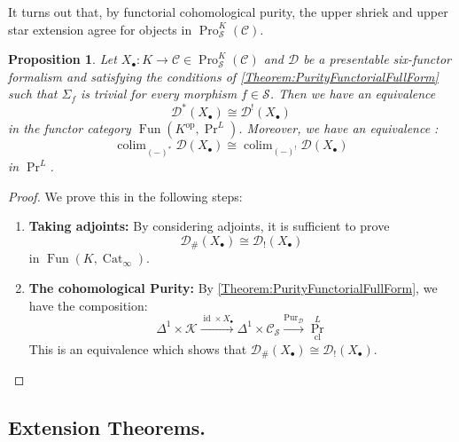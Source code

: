 \documentclass[14pt]{article}
\newtheorem{proposition}[theorem]{Proposition}
\theoremstyle{definition}
\newcommand{\D}{\mathcal{D}}
\newcommand{\K}{\mathcal{K}}
\newcommand{\op}[1]{\operatorname{#1}}
\renewcommand{\S}{\mathcal{S}}
\newcommand{\Ca}{\mathcal{C}}
\newcommand{\bb}{\bullet}
\numberwithin{subsection}{section}
\begin{document}
It turns out that, by functorial cohomological purity, the upper shriek and upper star extension agree for  objects in $\op{Pro}^K_{\S}(\Ca)$.
\begin{proposition}\label{uppershriekupperstarsmoothequivalence}
    Let $X_{\bb}: K \to \Ca \in \op{Pro}^K_{\S}(\Ca)$ and $\D$ be a presentable six-functor formalism and satisfying the conditions of \cref{Theorem:PurityFunctorialFullForm} such that $\Sigma_f$ is trivial for every morphism $f \in \S$. Then  we have an equivalence \begin{equation} \D^*(X_{\bb}) \cong \D^!(X_{\bb}) \end{equation} in the functor category $\op{Fun}(K^{\op{op}},\op{Pr}^L)$. Moreover, we have an 
     equivalence :
    \begin{equation}
      \op{colim}_{(-)^*}\D(X_{\bb}) \cong \op{colim}_{(-)^!} \D(X_{\bb})
    \end{equation}
    in $\op{Pr}^L$.
\end{proposition}
\begin{proof}
 We prove this in the following steps:
 \begin{enumerate}
     \item \textbf{Taking adjoints:}
     By considering adjoints, it is sufficient to prove
     \begin{equation}
        \D_{\#}(X_{\bb}) \cong \D_!(X_{\bb})
     \end{equation}
     in $\op{Fun}(K,\op{Cat}_{\infty})$.  
 \item \textbf{The cohomological Purity:} By \cref{Theorem:PurityFunctorialFullForm}, we have the composition:
 \begin{equation}
     \Delta^1 \times \K \xrightarrow{\op{id} \times X_{\bb}} \Delta^1 \times \Ca_{\S} \xrightarrow{\op{Pur}_{\D}} \op{Pr}^L_{\op{cl}}
 \end{equation}
 This is an equivalence which shows that $\D_{\#}(X_{\bb}) \cong \D_{!}(X_{\bb})$.
 \end{enumerate}
\end{proof}


\subsection{Extension Theorems.}
\end{document}

